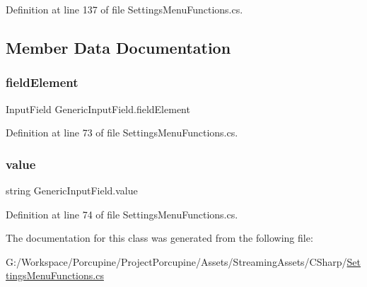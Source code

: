 Definition at line 137 of file Settings\+Menu\+Functions.\+cs.



\subsection{Member Data Documentation}
\mbox{\label{class_generic_input_field_a5147fb47b5c0f5391cd71249ea17cf3f}} 
\subsubsection{\texorpdfstring{field\+Element}{fieldElement}}
{\footnotesize\ttfamily Input\+Field Generic\+Input\+Field.\+field\+Element\hspace{0.3cm}{\ttfamily [protected]}}



Definition at line 73 of file Settings\+Menu\+Functions.\+cs.

\mbox{\label{class_generic_input_field_ae0165e8660f08a322838bdae1e8eb473}} 
\subsubsection{\texorpdfstring{value}{value}}
{\footnotesize\ttfamily string Generic\+Input\+Field.\+value\hspace{0.3cm}{\ttfamily [protected]}}



Definition at line 74 of file Settings\+Menu\+Functions.\+cs.



The documentation for this class was generated from the following file\+:\begin{DoxyCompactItemize}
\item 
G\+:/\+Workspace/\+Porcupine/\+Project\+Porcupine/\+Assets/\+Streaming\+Assets/\+C\+Sharp/\hyperlink{_settings_menu_functions_8cs}{Settings\+Menu\+Functions.\+cs}\end{DoxyCompactItemize}
